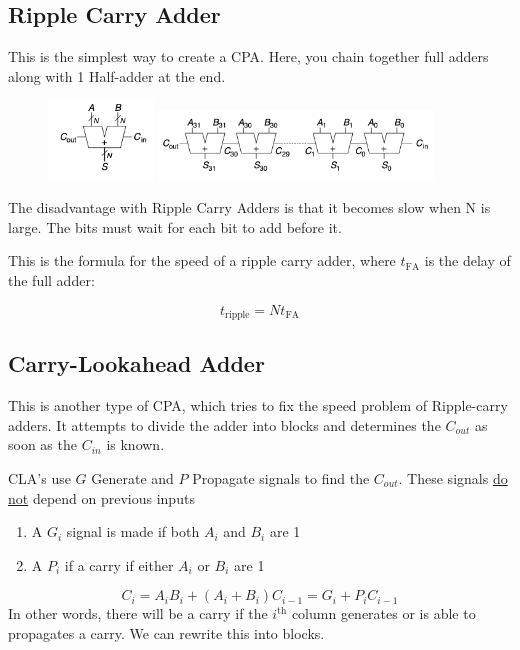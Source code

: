 \documentclass[12pt]{report}
\begin{document}
\subsection{Ripple Carry Adder}
This is the simplest way to create a CPA. Here, you chain together full adders along with 1 Half-adder at the end. 
\begin{figure}[h!]
  \centering
  \includegraphics[width=0.25\textwidth]{Carry-Propagate-adder.png} %
  \hspace{0.05\textwidth} %
  \includegraphics[width=0.65\textwidth]{Ripple-carry-adder.png} %
\end{figure}

The disadvantage with Ripple Carry Adders is that it becomes slow when N is large. 
The bits must wait for each bit to add before it. 

\smallbreak 
This is the formula for the speed of a ripple carry adder, where $t_{\mathrm{FA}}$ is the delay of the full adder:

\[
  t_{\mathrm{ripple}} = Nt_{\mathrm{FA}}
\]
\pagebreak

\subsection{Carry-Lookahead Adder}
This is another type of CPA, which tries to fix the speed problem of Ripple-carry adders. 
It attempts to divide the adder into blocks and determines the $C_{out}$ as soon as the $C_{in}$ is known.

\bigbreak
\noindent CLA's use $G$ Generate and $P$ Propagate signals to find the $C_{out}$. These signals \underline{do not} depend on previous inputs

\bigskip
\begin{enumerate}
  \item \noindent A $G_i$ signal is made if both $A_i$ and $B_i$ are 1 
  \item \noindent A $P_i$ if a carry if either $A_i$ or $B_i$ are 1
\end{enumerate}
\[
C_i = A_i B_i + (A_i + B_i)C_{i-1} = G_i + P_i C_{i-1}
\]
\noindent In other words, there will be a carry if the $i^{\mathrm{th}}$ column generates or is able to propagates a carry. 
We can rewrite this into blocks.
\end{document}
